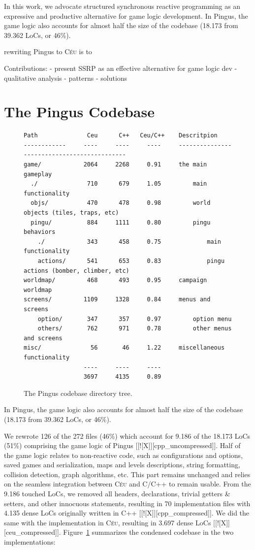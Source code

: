 \documentclass{vgtc}                          %
\newcommand{\CEU}{\textsc{C\'{e}u}\xspace}
\begin{document}
In this work, we advocate structured synchronous reactive programming as an
expressive and productive alternative for game logic development.
In Pingus, the game logic also accounts for almost half the size of the
codebase (18.173 from 39.362 LoCs, or 46\%).

rewriting Pingus to \CEU is to

Contributions:
    - present SSRP as an effective alternative for game logic dev
    - qualitative analysis
        - patterns
            - solutions


\section{The Pingus Codebase}

\begin{figure}[t]
\begin{verbatim}
Path              Ceu      C++   Ceu/C++    Descritpion
------------     ----     ----     ----     --------------------------------------------
game/            2064     2268     0.91     the main gameplay
  ./              710      679     1.05         main functionality
  objs/           470      478     0.98         world objects (tiles, traps, etc)
  pingu/          884     1111     0.80         pingu behaviors
    ./            343      458     0.75             main functionality
    actions/      541      653     0.83             pingu actions (bomber, climber, etc)
worldmap/         468      493     0.95     campaign worldmap
screens/         1109     1328     0.84     menus and screens
    option/       347      357     0.97         option menu
    others/       762      971     0.78         other menus and screens
misc/              56       46     1.22     miscellaneous functionality
                 ----     ----     ----
                 3697     4135     0.89
\end{verbatim}
\caption{The Pingus codebase directory tree.
\label{tab.tree}
}
\end{figure}

In Pingus, the game logic also accounts for almost half the size of the
codebase (18.173 from 39.362 LoCs, or 46\%).

We rewrote 126 of the 272 files (46\%) which account for 9.186 of the 18.173
LoCs (51\%) comprising the game logic of Pingus [[![X]][cpp\_uncompressed]].
Half of the game logic relates to non-reactive code, such as configurations and
options, saved games and serialization, maps and levels descriptions, string
formatting, collision detection, graph algorithms, etc.
This part remains unchanged and relies on the seamless integration between \CEU
and C/C++ to remain usable.
From the 9.186 touched LoCs, we removed all headers, declarations, trivial
getters \& setters, and other innocuous statements, resulting in 70
implementation files with 4.135 dense LoCs originally written in C++
[[![X]][cpp\_compressed]].
We did the same with the implementation in \CEU, resulting in 3.697 dense LoCs
[[![X]][ceu\_compressed]].
Figure~\ref{tab.tree} summarizes the condensed codebase in the two
implementations:
\end{document}
